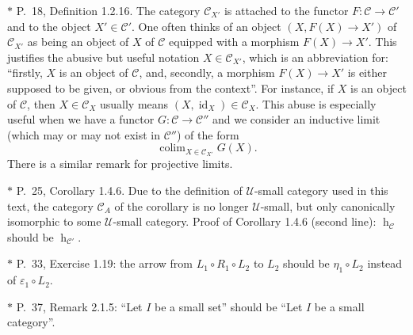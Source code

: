 \documentclass[12pt]{article}
\theoremstyle{remark}
\theoremstyle{definition}
\newcommand{\C}{\mathcal C}
\newcommand{\U}{\mathcal U}
\DeclareMathOperator*{\coli}{colim}
\DeclareMathOperator{\hy}{h}
\DeclareMathOperator{\id}{id}
\DeclareMathOperator{\op}{op}
\begin{document}
\noindent $*$ P.~18, Definition 1.2.16. The category $\C_{X'}$ is attached to the functor $F:\C\to\C'$ and to the object $X'\in\C'$. One often thinks of an object $(X,F(X)\to X')$ of $\C_{X'}$ as being an object of $X$ of $\C$ equipped with a morphism $F(X)\to X'$. This justifies the abusive but useful notation $X\in\C_{X'}$, which is an abbreviation for: ``firstly, $X$ is an object of $\C$, and, secondly, a morphism $F(X)\to X'$ is either supposed to be given, or obvious from the context''. For instance, if $X$ is an object of $\C$, then $X\in\C_X$ usually means $(X,\id_X)\in\C_X$. This abuse is especially useful when we have a functor $G:\C\to\C''$ and we consider an inductive limit (which may or may not exist in $\C''$) of the form 
%
\begin{equation}\label{convnot}
\coli_{X\in\C_{X'}}G(X).
\end{equation}
%
There is a similar remark for projective limits. 




\noindent $*$ P.~25, Corollary 1.4.6. Due to the definition of $\U$-small category used in this text, the category $\C_A$ of the corollary is no longer $\U$-small, but only canonically isomorphic to some $\U$-small category. Proof of Corollary 1.4.6 (second line): $\hy_{\C}$ should be $\hy_{\C'}$. 

\noindent $*$ P.~33, Exercise 1.19: the arrow from $L_1\circ R_1\circ L_2$ to $L_2$ should be $\eta_1\circ L_2$ instead of $\varepsilon_1\circ L_2$. 


\noindent $*$ P.~37, Remark 2.1.5: ``Let $I$ be a small set'' should be ``Let $I$ be a small category''.
\end{document}
